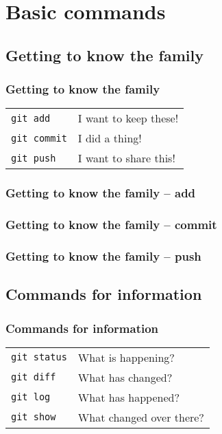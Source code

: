 \documentclass{beamer}
\begin{document}
\section{Basic commands}
\subsection{Getting to know the family}


\begin{frame}[fragile]
  \frametitle{Getting to know the family}

  \begin{tabular}{ll}
    \texttt{git add} & I want to keep these! \\
    \texttt{git commit} & I did a thing! \\
    \texttt{git push} & I want to share this! \\ %
  \end{tabular}

\end{frame}

\begin{frame}
  \frametitle{Getting to know the family -- add}
\end{frame}

\begin{frame}
  \frametitle{Getting to know the family -- commit}
\end{frame}

\begin{frame}
  \frametitle{Getting to know the family -- push}
\end{frame}

\subsection{Commands for information}

\begin{frame}[fragile]
  \frametitle{Commands for information}

  \begin{tabular}{ll}
    \texttt{git status} & What is happening? \\
    \texttt{git diff} & What has changed? \\
    \texttt{git log} & What has happened? \\
    \texttt{git show} & What changed over there? \\
  \end{tabular}

\end{frame}
\end{document}
